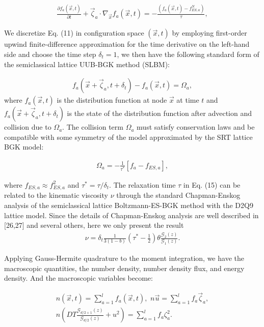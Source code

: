 \documentclass[doublecol]{epl2}
\begin{document}
\begin{align}
\frac{\partial f_a (\vec x, t)}{\partial t} + \vec \zeta_a \cdot
\nabla_{\vec x} f_a( \vec x, t) =  -\frac{(f_a(\vec x, t) - f^{N}_{ES,a})}{\tau},
\end{align}

We discretize Eq. (11) in configuration space $(\vec x,t)$ by employing first-order upwind finite-difference approximation for
the time derivative on the left-hand side and choose the time step $\delta_t = 1$, we then have the following standard form of the
semiclassical lattice UUB-BGK method (SLBM):

\begin{align}
f_a(\vec x+ \vec \zeta_a, t+\delta_t)- f_a(\vec x,t)=\Omega_a,
\end{align}
where $f_a(\vec x,t)$ is the distribution function at node $\vec x$ at time $t$ and $f_a(\vec x+ \vec \zeta_a, t+\delta_t)$ is the state of the distribution function after advection and collision due to $\Omega_a$.   The collision term $\Omega_a$ must satisfy conservation laws and be compatible with some symmetry of the model approximated by the SRT lattice BGK model:

\begin{align}
 \Omega_a = -\frac{1}{\tau^*}[f_a - f_{ES,a}],
\end{align}

where $f_{ES,a} \approx f_{ES,a}^{2}$ and $\tau^*= \tau/\delta_t$.
The relaxation time $\tau$ in Eq. (15) can be
related to the kinematic viscosity $\nu$ through the standard
Chapman-Enskog analysis of the semiclassical lattice Boltzmann-ES-BGK method with the D2Q9 lattice model.
Since the details of Chapman-Enskog analysis are well described in
[26,27] and several others, here we only present the result
\begin{align}
 \nu =\delta_t \frac{1}{3(1-b)}( \tau^* - \frac{1}{2}) \theta \frac{\mathcal{G}_{2}(z)}{\mathcal{G}_{1}(z)}.
\end{align}

Applying Gauss-Hermite quadrature to the moment integration, we have the macroscopic quantities, the number density, number density flux, and energy density. And the macroscopic variables become:

\begin{align}
n(\vec x, t) = \sum_{a=1}^l  f_a(\vec x, t), \,\,
n\vec u = \sum_{a=1}^l  f_a \vec \zeta_a, \nonumber \\
 n (DT \frac{\mathcal{G}_{d/2+1}(z)}{\mathcal{G}_{d/2}(z)} + u^2) = \sum_{a=1}^l f_a \zeta_a^2.
\end{align}
\end{document}
